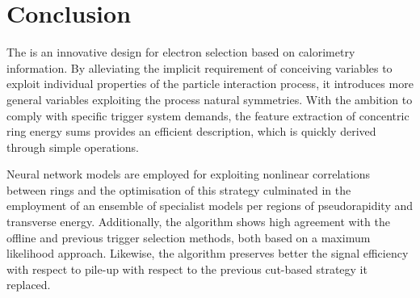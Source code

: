 \section{Conclusion}\label{sec:conclusion}


The \rnn{} is an innovative design for electron selection based on
calorimetry information. By alleviating the implicit requirement of conceiving
variables to exploit individual properties of the particle interaction process, it introduces 
more general variables exploiting the process natural symmetries. With the
ambition to comply with specific trigger system demands, the feature extraction
of concentric ring energy sums provides an efficient description, which is quickly derived
through simple operations. 


Neural network models are employed for exploiting
nonlinear correlations between rings and the optimisation of this strategy culminated in the employment of an ensemble of specialist models per regions of pseudorapidity and transverse energy. Additionally, the algorithm shows high agreement with the offline and previous trigger selection methods, both based on a maximum likelihood approach. Likewise, the \rnn{} algorithm preserves
better the signal efficiency with respect to pile-up with respect to the
previous cut-based strategy it replaced.


